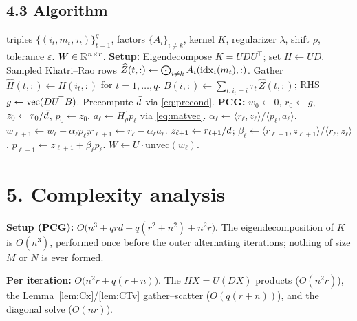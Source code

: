 \documentclass[11pt]{article}
\begin{document}
\subsection*{4.3 Algorithm}

\begin{algorithm}[H]
\caption{PCG for the transformed RKHS mode-$k$ subproblem}
\begin{algorithmic}[1]
\Require triples $\{(i_t,m_t,\tau_t)\}_{t=1}^q$, factors $\{A_i\}_{i\ne k}$,
         kernel $K$, regularizer $\lambda$, shift $\rho$, tolerance $\varepsilon$.
\Ensure $W\in\mathbb{R}^{n\times r}$.
\State \textbf{Setup:}
\State \quad Eigendecompose $K=UDU^{\!\top}$;\; set $H\gets UD$. 
\State \quad Sampled Khatri--Rao rows $\widehat Z(t,:)\gets\bigodot_{i\ne k}A_i(\mathrm{idx}_i(m_t),:)$. 
\State \quad Gather $\widehat H(t,:)\gets H(i_t,:)$ for $t=1,\dots,q$. 
\State \quad $B(i,:)\gets\sum_{t:i_t=i}\tau_t\,\widehat Z(t,:)$;\; RHS $g\gets\operatorname{vec}(DU^{\!\top}B)$. 
\State \quad Precompute $\bar d$ via \eqref{eq:precond}. 
\State \textbf{PCG:} $w_0\gets0$, $r_0\gets g$, $z_0\gets r_0/\bar d$, $p_0\gets z_0$.
  \State $a_\ell\gets H_\rho^{\,\prime}p_\ell$ via \eqref{eq:matvec}. 
  \State $\alpha_\ell\gets\langle r_\ell,z_\ell\rangle/\langle p_\ell,a_\ell\rangle$.
  \State $w_{\ell+1}\gets w_\ell+\alpha_\ell p_\ell$;\quad $r_{\ell+1}\gets r_\ell-\alpha_\ell a_\ell$.
  \State $z_{\ell+1}\gets r_{\ell+1}/\bar d$;\quad
         $\beta_\ell\gets\langle r_{\ell+1},z_{\ell+1}\rangle/\langle r_\ell,z_\ell\rangle$.
  \State $p_{\ell+1}\gets z_{\ell+1}+\beta_\ell p_\ell$.
\EndFor
\State \Return $W\gets U\cdot\mathrm{unvec}(w_\ell)$. 
\end{algorithmic}
\end{algorithm}

\section*{5. Complexity analysis}

\textbf{Setup (PCG):}
$O\bigl(n^3 + qrd + q(r^2+n^2) + n^2r\bigr)$. The eigendecomposition of $K$ is
$O(n^3)$, performed once before the outer alternating iterations; nothing of
size $M$ or $N$ is ever formed.

\textbf{Per iteration:} $O\bigl(n^2r + q(r+n)\bigr)$. The $HX=U(DX)$ products
($O(n^2r)$), the Lemma~\ref{lem:Cx}/\ref{lem:CTv} gather--scatter
($O(q(r+n))$), and the diagonal solve ($O(nr)$).
\end{document}
